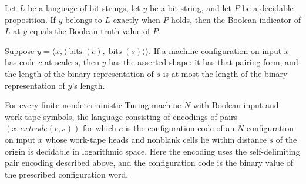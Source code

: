 \begin{lemma}
\label{Complexity.Codec.indicator_eq_of_iff}
\leanok
{}
Let $L$ be a language of bit strings, let $y$ be a bit string, and let $P$ be a
decidable proposition. If $y$ belongs to $L$ exactly when $P$ holds, then the Boolean
indicator of $L$ at $y$ equals the Boolean truth value of $P$.
\end{lemma}

\begin{lemma}
\label{Complexity.Codec.shape_of_code}
\leanok
{}
Suppose $y=\langle
x,\langle\operatorname{bits}(c),\operatorname{bits}(s)\rangle\rangle$. If a machine
configuration on input $x$ has code $c$ at scale $s$, then $y$ has the asserted shape:
it has that pairing form, and the length of the binary representation of $s$ is at most
the length of the binary representation of $y$'s length.
\end{lemma}

\begin{theorem}
\label{Complexity.Codec.validLang_mem}
\leanok
{}
For every finite nondeterministic Turing machine $N$ with Boolean input and work-tape
symbols, the language consisting of encodings of pairs $(x,	ext{code}(c,s))$ for which
$c$ is the configuration code of an $N$-configuration on input $x$ whose work-tape heads
and nonblank cells lie within distance $s$ of the origin is decidable in logarithmic
space. Here the encoding uses the self-delimiting pair encoding described above, and the
configuration code is the binary value of the prescribed configuration word.
\end{theorem}

